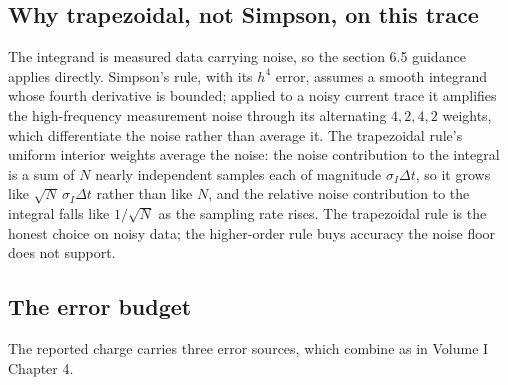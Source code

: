 \subsection{Why trapezoidal, not Simpson, on this trace}

The integrand is measured data carrying noise, so the section 6.5
guidance applies directly. Simpson's rule, with its $h^{4}$ error,
assumes a smooth integrand whose fourth derivative is bounded; applied
to a noisy current trace it amplifies the high-frequency measurement
noise through its alternating $4, 2, 4, 2$ weights, which differentiate
the noise rather than average it. The trapezoidal rule's uniform
interior weights average the noise: the noise contribution to the
integral is a sum of $N$ nearly independent samples each of magnitude
$\sigma_{I}\Delta t$, so it grows like $\sqrt{N}\,\sigma_{I}\Delta t$
rather than like $N$, and the relative noise contribution to the
integral falls like $1/\sqrt{N}$ as the sampling rate rises. The
trapezoidal rule is the honest choice on noisy data; the higher-order
rule buys accuracy the noise floor does not support.

\subsection{The error budget}

The reported charge carries three error sources, which combine as in
Volume I Chapter 4.

